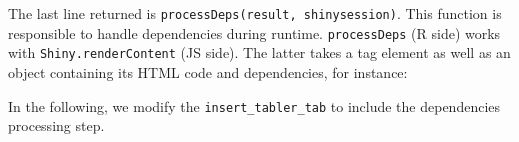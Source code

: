 \documentclass[
]{book}
\newenvironment{Shaded}{\begin{snugshade}}{\end{snugshade}}
\newcommand{\AttributeTok}[1]{\textcolor[rgb]{0.77,0.63,0.00}{#1}}
\newcommand{\DataTypeTok}[1]{\textcolor[rgb]{0.13,0.29,0.53}{#1}}
\newcommand{\DecValTok}[1]{\textcolor[rgb]{0.00,0.00,0.81}{#1}}
\newcommand{\NormalTok}[1]{#1}
\newcommand{\OperatorTok}[1]{\textcolor[rgb]{0.81,0.36,0.00}{\textbf{#1}}}
\newcommand{\VariableTok}[1]{\textcolor[rgb]{0.00,0.00,0.00}{#1}}
\begin{document}
The last line returned is \texttt{processDeps(result,\ shinysession)}. This function is responsible to handle dependencies during runtime. \texttt{processDeps} (R side) works with \texttt{Shiny.renderContent} (JS side). The latter takes a tag element as well as an object containing its HTML code and dependencies, for instance:

\begin{Shaded}
\end{Shaded}

In the following, we modify the \texttt{insert\_tabler\_tab} to include the dependencies processing step.
\end{document}
